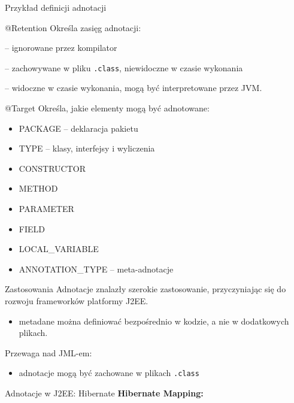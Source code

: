 \documentclass{beamer}
\begin{document}
\begin{frame}{Przykład definicji adnotacji}

\end{frame}

\begin{frame}{@Retention}
Określa zasięg adnotacji:
\begin{description}[RUNTIME]
\item<1->[SOURCE] -- ignorowane przez kompilator
\item<2->[CLASS] -- zachowywane w pliku \texttt{.class}, niewidoczne w czasie
  wykonania
\item<3->[RUNTIME] -- widoczne w czasie wykonania, mogą być interpretowane
  przez JVM.
\end{description}
\end{frame}

\begin{frame}{@Target}
Określa, jakie elementy mogą być adnotowane:
\begin{itemize}[ANNOTATION\_TYPE]
\item<1-> PACKAGE -- deklaracja pakietu
\item<2-> TYPE -- klasy, interfejsy i wyliczenia
\item<3-> CONSTRUCTOR $\quad$
\item<3-> METHOD $\quad$
\item<4-> PARAMETER $\quad$
\item<4-> FIELD $\quad$
\item<4-> LOCAL\_VARIABLE $\quad$
\item<5-> ANNOTATION\_TYPE -- meta-adnotacje
\end{itemize}
\end{frame}

\begin{frame}{Zastosowania}
Adnotacje znalazły szerokie zastosowanie, przyczyniając się 
do rozwoju frameworków platformy J2EE.
\begin{itemize}
\item metadane można definiować bezpośrednio w kodzie, 
  a nie w dodatkowych plikach.
\end{itemize}
\pause
Przewaga nad JML-em: 
\begin{itemize}
\item adnotacje mogą być zachowane w plikach \texttt{.class}
\end{itemize}
\end{frame}

\begin{frame}{Adnotacje w J2EE: Hibernate}
  \textbf{Hibernate Mapping:}
  
\end{frame}
\end{document}
